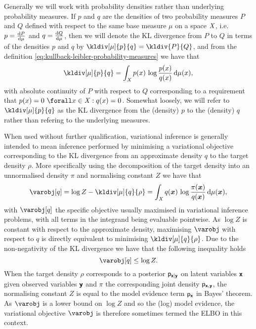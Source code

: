 Generally we will work with probability densities rather than underlying probability measures. If $p$ and $q$ are the densities of two probability measures $P$ and $Q$ defined with respect to the same base measure $\mu$ on a space $\mathit{X}$, i.e. $p = \frac{\mathrm{d} P}{\mathrm{d} \mu}$ and $q = \frac{\mathrm{d} Q}{\mathrm{d} \mu}$, then we will denote the \ac{KL} divergence from $P$ to $Q$ in terms of the densities $p$ and $q$ by $\kldiv[\mu]{p}{q} = \kldiv{P}{Q}$, and from the definition \eqref{eq:kullback-leibler-probability-measures} we have that
\begin{equation}\label{eq:kullback-leibler-probability-densities}
  \kldiv[\mu]{p}{q} =
  \int_{\set{X}} p(x) \, \log\frac{p(x)}{q(x)} \, \dr\mu(x),
\end{equation}
with absolute continuity of $P$ with respect to $Q$ corresponding to a requirement that $p(x) = 0 ~\forall x \in \set{X} : q(x) = 0$. Somewhat loosely, we will refer to $\kldiv[\mu]{p}{q}$ as the \ac{KL} divergence from the (density) $p$ to the (density) $q$ rather than refering to the underlying measures.

When used without further qualification, variational inference is generally intended to mean inference performed by minimising a variational objective corresponding to the \ac{KL} divergence from an approximate density $q$ to the target density $\rho$. More specifically using the decomposition of the target density into an unnormalised density $\pi$ and normalising constant $Z$ we have that
\begin{equation}\label{eq:kullback-leibler-var-obj}
  \varobj\lsb q \rsb = \log Z - \kldiv[\mu]{q}{\rho} =
  \int_{\set{X}} q(\vct{x})\,\log \frac{\pi(\vct{x})}{q(\vct{x})} \,\dr\mu(\vct{x}),
\end{equation}
with $\varobj\lsb q \rsb$ the specific objective usually maximised in variational inference problems, with all terms in the integrand being evaluable pointwise. As $\log Z$ is constant with respect to the approximate density, maximising $\varobj$ with respect to $q$ is directly equivalent to minimising $\kldiv[\mu]{q}{\rho}$. Due to the non-negativity of the \ac{KL} divergence we have that the following inequality holds
\begin{equation}\label{eq:evidence-lower-bound}
  \varobj\lsb q \rsb \leq \log Z.
\end{equation}
When the target density $\rho$ corresponds to a posterior $\mathsf{p}_{\boldsymbol{\mathsf{x}}|\boldsymbol{\mathsf{y}}}$ on latent variables $\boldsymbol{\mathsf{x}}$ given observed variables $\boldsymbol{\mathsf{y}}$ and $\pi$ the corresponding joint density $\mathsf{p}_{\boldsymbol{\mathsf{x}},\boldsymbol{\mathsf{y}}}$, the normalising constant $Z$ is equal to the model evidence term $\mathsf{p}_{\boldsymbol{\mathsf{x}}}$ in Bayes' theorem. As $\varobj$ is a lower bound on $\log Z$ and so the (log) model evidence, the variational objective $\varobj$ is therefore sometimes termed the \ac{ELBO} in this context.

